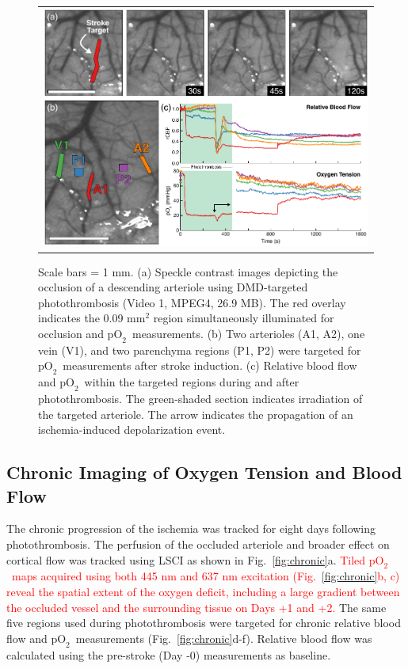 \documentclass[12pt]{spieman}  %
\newcommand{\pO}{\ensuremath{\text{pO}_2}}
\begin{document}
\begin{spacing}{2}
\begin{figure}
    \begin{center}
        \begin{tabular}{c}
            \includegraphics[width=6.25in]{Figure5.pdf}
        \end{tabular}
    \end{center}
    \caption {
        \label{fig:photothrombosis}
        Scale bars = 1 mm. (a) Speckle contrast images depicting the occlusion of a descending arteriole using DMD-targeted photothrombosis (Video 1, MPEG4, 26.9 MB). The red overlay indicates the 0.09 mm$^{2}$ region simultaneously illuminated for occlusion and \pO\ measurements. (b) Two arterioles (A1, A2), one vein (V1), and two parenchyma regions (P1, P2) were targeted for \pO\ measurements after stroke induction. (c) Relative blood flow and \pO\ within the targeted regions during and after photothrombosis. The green-shaded section indicates irradiation of the targeted arteriole. The arrow indicates the propagation of an ischemia-induced depolarization event.
    }
\end{figure}


\subsection{Chronic Imaging of Oxygen Tension and Blood Flow}

The chronic progression of the ischemia was tracked for eight days following photothrombosis. The perfusion of the occluded arteriole and broader effect on cortical flow was tracked using LSCI as shown in Fig.~\ref{fig:chronic}a. \textcolor{red}{Tiled \pO\ maps acquired using both 445 nm and 637 nm excitation (Fig.~\ref{fig:chronic}b, c) reveal the spatial extent of the oxygen deficit, including a large gradient between the occluded vessel and the surrounding tissue on Days +1 and +2.} The same five regions used during photothrombosis were targeted for chronic relative blood flow and \pO\ measurements (Fig.~\ref{fig:chronic}d-f). Relative blood flow was calculated using the pre-stroke (Day -0) measurements as baseline.


\end{spacing}
\end{document}
